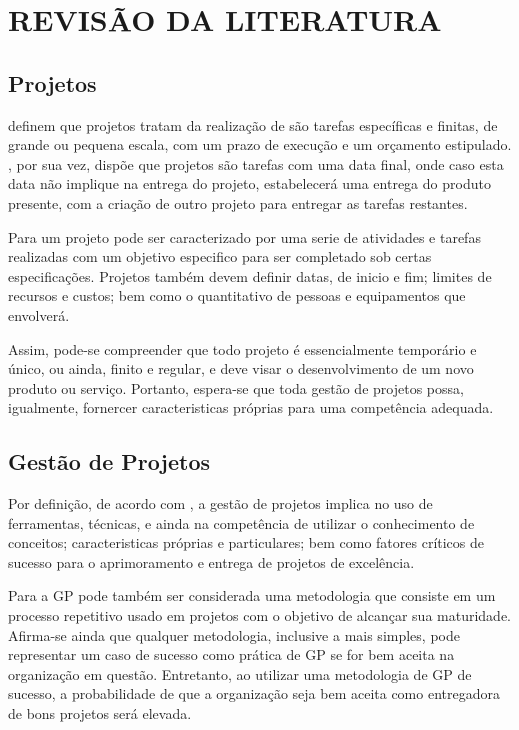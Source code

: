 \chapter{REVISÃO DA LITERATURA}
\thispagestyle{empty}

\section{Projetos}

 definem que projetos tratam da realização de são tarefas específicas e finitas, de grande ou pequena escala, com um prazo de execução e um orçamento estipulado. , por sua vez, dispõe que projetos são tarefas com uma data final, onde caso esta data não implique na entrega do projeto, estabelecerá uma entrega do produto presente, com a criação de outro projeto para entregar as tarefas restantes.

Para  um projeto pode ser caracterizado por uma serie de atividades e tarefas realizadas com um objetivo especifico para ser completado sob certas especificações. Projetos também devem definir datas, de inicio e fim; limites de recursos e custos; bem como o quantitativo de pessoas e equipamentos que envolverá.

Assim, pode-se compreender que todo projeto é essencialmente temporário e único, ou ainda, finito e regular, e deve visar o desenvolvimento de um novo produto ou serviço. Portanto, espera-se que toda gestão de projetos possa, igualmente, fornercer caracteristicas próprias para uma competência adequada.

\section{Gestão de Projetos}

Por definição, de acordo com , a gestão de projetos implica no uso de ferramentas, técnicas, e ainda na competência de utilizar o conhecimento de conceitos; caracteristicas próprias e particulares; bem como fatores críticos de sucesso para o aprimoramento e entrega de projetos de excelência.

Para  a GP pode também ser considerada uma metodologia que consiste em um processo repetitivo usado em projetos com o objetivo de alcançar sua maturidade. Afirma-se ainda que qualquer metodologia, inclusive a mais simples, pode representar um caso de sucesso como prática de GP se for bem aceita na organização em questão. Entretanto, ao utilizar uma metodologia de GP de sucesso, a probabilidade de que a organização seja bem aceita como entregadora de bons projetos será elevada\cite{kerzner2013project}.

